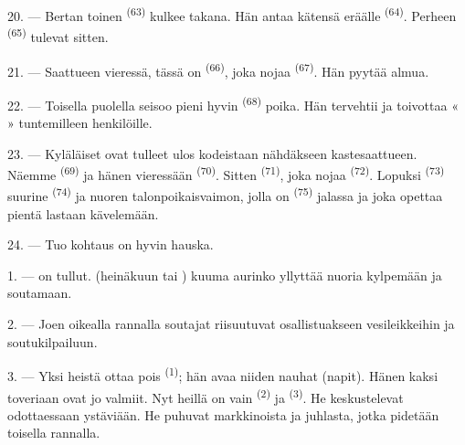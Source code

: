 20. --- Bertan toinen  \textsuperscript{(63)} kulkee takana. Hän
antaa kätensä eräälle  \textsuperscript{(64)}. Perheen
 \textsuperscript{(65)} tulevat sitten.

\VUsaut{4.6mm}
\VUsaut{3.4mm}

21. --- Saattueen vieressä, tässä on  \textsuperscript{(66)},
joka nojaa  \textsuperscript{(67)}. Hän pyytää
almua.

22. --- Toisella puolella seisoo pieni hyvin 
\textsuperscript{(68)} poika. Hän tervehtii ja toivottaa
«  » tuntemilleen henkilöille.

23. --- Kyläläiset ovat tulleet ulos kodeistaan nähdäkseen kastesaattueen.
Näemme  \textsuperscript{(69)}
 ja hänen vieressään
 \textsuperscript{(70)}. Sitten  \textsuperscript{(71)}, joka nojaa 
\textsuperscript{(72)}. Lopuksi  \textsuperscript{(73)} suurine
 \textsuperscript{(74)} ja nuoren talonpoikaisvaimon,
jolla on  \textsuperscript{(75)} jalassa ja joka opettaa pientä
lastaan kävelemään.

24. --- Tuo kohtaus on hyvin hauska.
\VUsaut{4.0mm}

\VUsaut{3.0mm}

\VUsaut{2.4mm}

\VUsaut{3.0mm}

1. ---  on tullut.  (heinäkuun tai
) kuuma aurinko yllyttää nuoria kylpemään ja soutamaan.

2. --- Joen oikealla rannalla soutajat riisuutuvat osallistuakseen vesileikkeihin
ja soutukilpailuun.

3. --- Yksi heistä ottaa pois  \textsuperscript{(1)}; hän avaa
niiden nauhat (napit). Hänen kaksi toveriaan ovat jo valmiit. Nyt heillä on vain
 \textsuperscript{(2)} ja 
\textsuperscript{(3)}. He keskustelevat odottaessaan ystäviään. He puhuvat
markkinoista ja juhlasta, jotka pidetään toisella rannalla.

